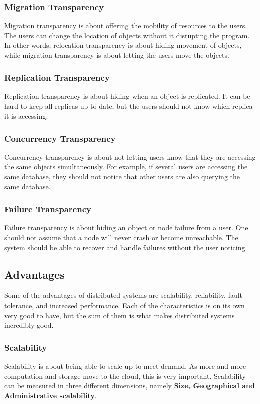 \subsubsection{Migration Transparency}
Migration transparency is about offering the mobility of resources to the users. The users can change the location of objects without it disrupting the program. In other words, relocation transparency is about hiding movement of objects, while migration transparency is about letting the users move the objects.

\subsubsection{Replication Transparency}
Replication transparency is about hiding when an object is replicated. It can be hard to keep all replicas up to date, but the users should not know which replica it is accessing.

\subsubsection{Concurrency Transparency}
Concurrency transparency is about not letting users know that they are accessing the same objects simultaneously. For example, if several users are accessing the same database, they should not notice that other users are also querying the same database.

\subsubsection{Failure Transparency}
Failure transparency is about hiding an object or node failure from a user. One should not assume that a node will never crash or become unreachable. The system should be able to recover and handle failures without the user noticing.


\subsection{Advantages}
Some of the advantages of distributed systems are scalability, reliability, fault tolerance, and increased performance. Each of the characteristics is on its own very good to have, but the sum of them is what makes distributed systems incredibly good.

\subsubsection{Scalability}
Scalability is about being able to scale up to meet demand. As more and more computation and storage move to the cloud, this is very important. Scalability can be measured in three different dimensions, namely \textbf{Size, Geographical and Administrative scalability}.

